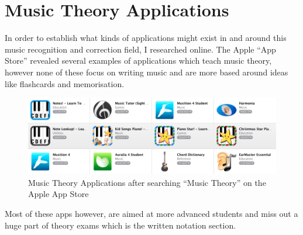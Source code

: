 \section{Music Theory Applications}
\label{sec:music-theory-apps}
In order to establish what kinds of applications might exist in and around this music recognition and correction field, I researched online. The Apple ``App Store'' revealed several examples of applications which teach music theory, however none of these focus on writing music and are more based around ideas like flashcards and memorisation.

\begin{figure}[h!]
  \centering
  \includegraphics[width=\linewidth]{gfx/music-theory-apps.png}
  \caption{Music Theory Applications after searching ``Music Theory'' on the Apple App Store}
\end{figure}

Most of these apps however, are aimed at more advanced students and miss out a huge part of theory exams which is the written notation section.

